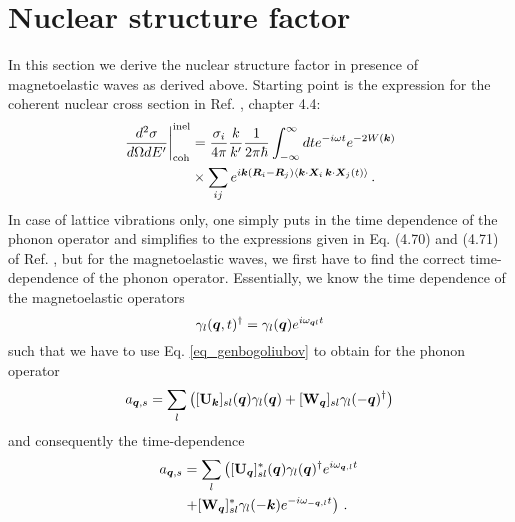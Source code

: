 \documentclass[aps,prl,twocolumn,superscriptaddress,amsmath,amssymb,floats,aps,10pt]{revtex4-1}
\begin{document}
\section{Nuclear structure factor}
In this section we derive the nuclear structure factor in presence of magnetoelastic waves as derived above.
Starting point is the expression for the coherent nuclear cross section in Ref. , chapter 4.4:
\begin{align}
  \left.\frac{d^2 \sigma}{d \Omega dE'}\right|_{\text{coh}}^{\text{inel}}&=\frac{\sigma_i}{4\pi}\frac{k}{k'} \frac{1}{2\pi \hbar}\int_{-\infty}^{\infty} dt e^{-i\omega t} e^{-2W(\bm k)}\notag\\
 &\times \sum_{ij}e^{i\bm k(\bm R_i-\bm R_j) \langle \bm k\cdot\bm X_i\,\bm k\cdot\bm X_j(t)\rangle}\,.
\end{align}
In case of lattice vibrations only, one simply puts in the time dependence of the phonon operator and simplifies to the expressions given in Eq. (4.70) and (4.71) of Ref. ,
but for the magnetoelastic waves, we first have to find the correct time-dependence of the phonon operator.
Essentially, we know the time dependence of the magnetoelastic operators
\begin{equation}
 \gamma_l(\bm q,t)^\dagger=\gamma_l(\bm q)e^{i\omega_{\bm q l}t} 
\end{equation}
such that we have to use Eq. \ref{eq_genbogoliubov} to obtain for the phonon operator
\begin{equation}
 a_{\bm q, s}=\sum_l\left([{\mathbf U}_{\bm k}]_{sl}(\bm q)\gamma_l(\bm q)+[{\mathbf W}_{\bm q}]_{sl}\gamma_l(-\bm q)^\dagger\right)
\end{equation}
and consequently the time-dependence
\begin{align}
 a_{\bm q,s}&=\sum_l\left([{\mathbf U}_{\bm q}]^*_{sl}(\bm q)\gamma_l(\bm q)^\dagger e^{i\omega_{\bm q,l}t}\right.\notag\\
 &\left.+[{\mathbf W}_{\bm q}]^*_{sl}\gamma_l(-\bm k)e^{-i\omega_{-\bm q,l}t}\right)\,.
\end{align}
\end{document}
